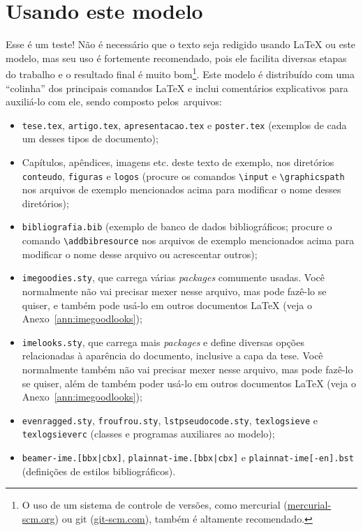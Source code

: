 
\chapter{Usando este modelo}

Esse é um teste!
Não é necessário que o texto seja redigido usando \LaTeX{} ou este modelo,
mas seu uso é fortemente recomendado, pois ele facilita diversas etapas do
trabalho e o resultado final é muito bom\footnote{O uso de um sistema de
controle de versões, como mercurial (\url{mercurial-scm.org}) ou git
(\url{git-scm.com}), também é altamente recomendado.}. Este modelo é
distribuído com uma ``colinha'' dos principais comandos \LaTeX{} e
inclui comentários explicativos para auxiliá-lo com ele, sendo composto
pelos~arquivos:

\enlargethispage{-1\baselineskip}

\begin{itemize}
  \item \texttt{tese.tex}, \texttt{artigo.tex}, \texttt{apresentacao.tex}
        e \texttt{poster.tex} (exemplos de cada um desses tipos de documento);
  \item Capítulos, apêndices, imagens etc. deste texto de exemplo, nos
        diretórios \texttt{conteudo}, \texttt{figuras} e \texttt{logos}
        (procure os comandos \texttt{\textbackslash{}input} e
        \texttt{\textbackslash{}graphicspath} nos arquivos de exemplo
        mencionados acima para modificar o nome desses diretórios);
  \item \texttt{bibliografia.bib} (exemplo de banco de dados bibliográficos;
        procure o comando \texttt{\textbackslash{}addbibresource} nos
        arquivos de exemplo mencionados acima para modificar o nome desse
        arquivo ou acrescentar outros);
  \item \texttt{imegoodies.sty}, que carrega várias \emph{packages} comumente
        usadas. Você normalmente não vai precisar mexer nesse arquivo, mas
        pode fazê-lo se quiser, e também pode usá-lo em outros documentos
        \LaTeX{} (veja o Anexo~\ref{ann:imegoodlooks});
  \item \texttt{imelooks.sty}, que carrega mais \emph{packages} e define
        diversas opções relacionadas à aparência do documento, inclusive
        a capa da tese. Você normalmente também não vai precisar mexer
        nesse arquivo, mas pode fazê-lo se quiser, além de também poder
        usá-lo em outros documentos \LaTeX{} (veja o Anexo~\ref{ann:imegoodlooks});
  \item \texttt{evenragged.sty}, \texttt{froufrou.sty}, \texttt{lstpseudocode.sty},
        \texttt{texlogsieve} e \texttt{texlogsieverc} (classes e programas
        auxiliares ao modelo);
  \item \texttt{beamer-ime.[bbx|cbx]}, \texttt{plainnat-ime.[bbx|cbx]} e
        \texttt{plainnat-ime[-en].bst} (definições de estilos bibliográficos).
\end{itemize}

